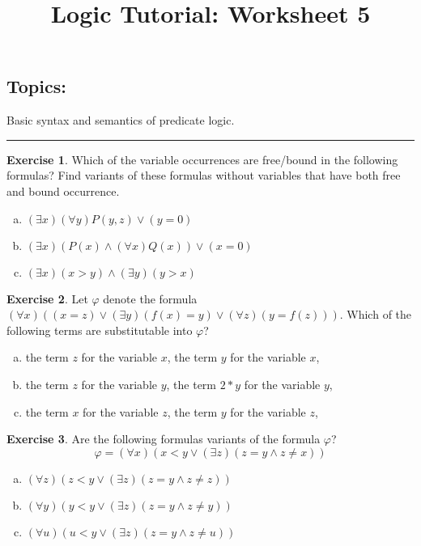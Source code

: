 \documentclass[11pt,a4paper]{amsart}
\title{\sc Logic Tutorial: Worksheet 5}
\date{}
\theoremstyle{definition}
\newtheorem{problem}{Exercise}
\begin{document}
\maketitle

\vspace{-24pt}

\subsection*{Topics:} Basic syntax and semantics of predicate logic.

\medskip
\hrule


\bigskip\begin{problem}
Which of the variable occurrences are free/bound in the following formulas? Find variants of these formulas without variables that have both free and bound occurrence.
\begin{enumerate}[(a)]
   \item $(\exists x)(\forall y)P(y,z) \vee (y=0)$
   \item $(\exists x)(P(x) \wedge (\forall x)Q(x)) \vee (x=0)$
   \item $(\exists x)(x>y) \wedge (\exists y)(y>x)$
\end{enumerate}
\end{problem}

\bigskip\begin{problem}
Let $\varphi$ denote the formula $(\forall x)((x=z) \vee (\exists y)(f(x)=y) \vee (\forall z)(y=f(z)))$. Which of the following terms are substitutable into $\varphi$?
\begin{enumerate}[(a)]
   \item the term $z$ for the variable $x$, the term $y$ for the variable $x$,
   \item the term $z$ for the variable $y$, the term $2*y$ for the variable $y$,
   \item the term $x$ for the variable $z$, the term $y$ for the variable $z$,
\end{enumerate}
\end{problem}

\bigskip\begin{problem}
Are the following formulas variants of the formula $\varphi$? $$\varphi=(\forall x)(x<y \vee (\exists z)(z=y \wedge z\ne x))$$
\begin{enumerate}[(a)]
\item $(\forall z)(z<y \vee (\exists z)(z=y \wedge z\ne z))$
\item $(\forall y)(y<y \vee (\exists z)(z=y \wedge z\ne y))$
\item $(\forall u)(u<y \vee (\exists z)(z=y \wedge z\ne u))$
\end{enumerate}
\end{problem}
\end{document}
